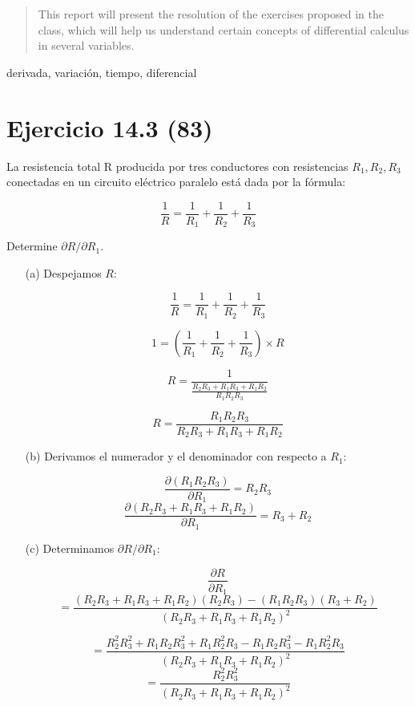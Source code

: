 

\tableofcontents \vspace{2mm}

\begin{abstract}
This report will present the resolution of the exercises proposed in the class, which will help us understand certain concepts of differential calculus in several variables.
\end{abstract}

\renewcommand{\IEEEkeywordsname}{Keywords}
\begin{IEEEkeywords}
derivada, variación, tiempo, diferencial
\end{IEEEkeywords}

\section{Ejercicio 14.3 (83)}\label{intro}

La resistencia total R producida por tres conductores con resistencias \(R_{1}, R_{2}, R_{3}\) conectadas en un circuito eléctrico paralelo está dada por la fórmula:

\[\frac{1}{R} = \frac{1}{R_{1}} + \frac{1}{R_{2}} + \frac{1}{R_{3}}\]

Determine \(\partial R / \partial R_{1}\).
\vspace{0.5cm}
\begin{enumerate}
    \item[(a)] Despejamos \(R\):

        \[\frac{1}{R} = \frac{1}{R_1} + \frac{1}{R_2} + \frac{1}{R_3}\]
        
        \[1 = \left(\frac{1}{R_1} + \frac{1}{R_2} + \frac{1}{R_3}\right) \times R\]
        
        \[R = \frac{1}{\frac{R_2R_3 + R_1R_3 + R_1R_2}{R_1R_2R_3}}\]
        
        \[R = \frac{R_1R_2R_3}{R_2R_3 + R_1R_3 + R_1R_2}\]

    \item[(b)] Derivamos el numerador y el denominador con respecto a  \(R_{1}\):

        \[ \frac{\partial (R_1R_2R_3)}{\partial R_{1}} = R_2R_3 \]
        \[ \frac{\partial (R_2R_3 + R_1R_3 + R_1R_2)}{\partial R_{1}} =R_3 +  R_2 \]

    \item[(c)] Determinamos \(\partial R / \partial R_{1}\):

        \[\frac{\partial R}{\partial R_{1}}\]
        \[
             = \frac{(R_2R_3 + R_1R_3 + R_1R_2)(R_2R_3) - (R_1R_2R_3)(R_3 +  R_2)}{(R_2R_3 + R_1R_3 + R_1R_2)^{2}}
        \]

        \[ = \frac{R_2^{2}R_3^{2} + R_1R_2R_3^{2} + R_1R_2^{2}R_3 - R_1R_2R_3^{2} - R_1R_2^{2}R_3}{(R_2R_3 + R_1R_3 + R_1R_2)^{2}}\]
        \[ = \frac{R_2^{2}R_3^{2}}{(R_2R_3 + R_1R_3 + R_1R_2)^{2}}\]

\end{enumerate}
